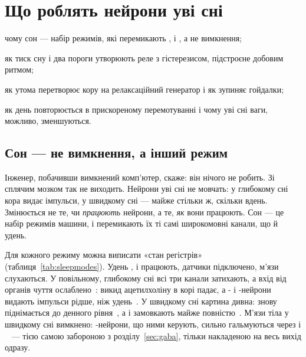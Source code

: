 \chapter{Що роблять нейрони уві сні}
\label{sec:sleep}
\begin{chaptergoals}
\item чому сон --- набір режимів, які перемикають ,  і , а не вимкнення;
\item як тиск сну і два пороги утворюють реле з гістерезисом, підстроєне добовим ритмом;
\item як утома перетворює кору на релаксаційний генератор і як  зупиняє гойдалки;
\item як день повторюється в прискореному перемотуванні і чому уві сні ваги, можливо, зменшуються.
\end{chaptergoals}

\section{Сон --- не вимкнення, а інший режим}

Інженер, побачивши вимкнений комп'ютер, скаже: він нічого не робить. Зі сплячим мозком так не виходить. Нейрони уві сні не мовчать: у глибокому сні кора видає імпульси, у швидкому сні --- майже стільки ж, скільки вдень. Змінюється не те, чи \emph{працюють} нейрони, а те, \emph{як} вони працюють. Сон --- це набір режимів машини, і перемикають їх ті самі широкомовні канали, що й удень.

Для кожного режиму можна виписати «стан регістрів» (таблиця~\ref{tab:sleepmodes}). Удень ,  і  працюють, датчики підключено, м'язи слухаються. У повільному, глибокому сні всі три канали затихають, а вхід від органів чуття ослаблено~\cite{Hasselmo1999}: викид ацетилхоліну в корі падає, а - і -нейрони видають імпульси рідше, ніж удень~\cite{Marrosu1995,AstonJonesBloom1981,McGintyHarper1976}. У швидкому сні картина дивна:  знову піднімається до денного рівня~\cite{Marrosu1995}, а  і  замовкають майже повністю~\cite{AstonJonesBloom1981,McGintyHarper1976,JacobsAzmitia1992}. М'язи тіла у швидкому сні вимкнено: -нейрони, що ними керують, сильно гальмуються через  і ~\cite{BrooksPeever2012} --- тією самою забороною з розділу~\ref{sec:gaba}, тільки накладеною на весь вихід одразу.

